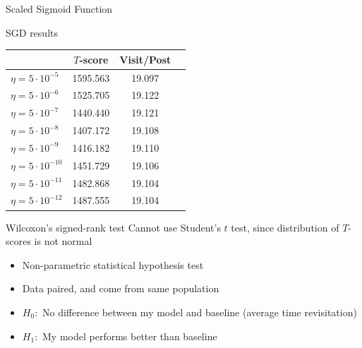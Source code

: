 \documentclass[12pt]{../presentation}
\newcommand{\weights}{\mathbf{w}}
\newcommand{\X}{\mathbf{X}}
\begin{document}
\begin{frame}{Scaled Sigmoid Function}
\begin{center}
\end{center}
\end{frame}

\begin{frame}{SGD results}
	\begin{center}
		\footnotesize
		\begin{tabular}{ | l | c | c | c | }
			\hline
				  & $T$-score			   &	Visit/Post\\
			\hline
	$\eta=5\cdot10^{-5}$ &	1595.563 &	    19.097 \\
	$\eta=5\cdot10^{-6}$ &	1525.705 &	    19.122 \\
	$\eta=5\cdot10^{-7}$ &	1440.440 &	    19.121 \\
\rowcolor{green}
	$\eta=5\cdot10^{-8}$ &	1407.172 &	    19.108 \\
	$\eta=5\cdot10^{-9}$ &	1416.182 &	    19.110 \\
	$\eta=5\cdot10^{-10}$ &	1451.729 &	    19.106 \\
	$\eta=5\cdot10^{-11}$ &	1482.868 &	    19.104 \\
	$\eta=5\cdot10^{-12}$ &	1487.555 &	    19.104 \\
			\hline
		\end{tabular}
	\end{center}
\end{frame}
\begin{frame}{Wilcoxon's signed-rank test}
Cannot use Student's $t$ test, since distribution of $T$-scores is not normal
\begin{itemize}
\item Non-parametric statistical hypothesis test
\item Data paired, and come from same population
\item $H_0:$ No difference between my model and baseline (average time revisitation)
\item $H_1:$ My model performs better than baseline
\end{itemize}	
\end{frame}
\end{document}
